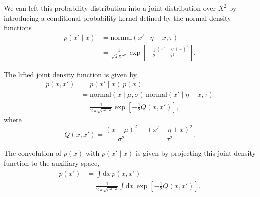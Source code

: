 \documentclass[11pt, oneside]{article}
\begin{document}
We can left this probability distribution into a joint distribution 
over $X^{2}$ by introducing a conditional probability kernel defined
by the normal density functions
%
%
\begin{align*}
p( x' \mid x )
&=
\text{normal} ( x' \mid \eta - x, \tau )
\\
&=
\frac{1}{ \sqrt{ 2 \, \pi \, \tau^{2} } }
\exp \left[
  -\frac{1}{2} \frac{ ( x' - \eta + x )^{2} }{ \tau^{2} }
\right].
\end{align*}

The lifted joint density function is given by
%
\begin{align*}
p( x, x' )
&=
p( x' \mid x ) \, p( x )
\\
&=
\text{normal} ( x \mid \mu, \sigma ) \,
\text{normal} ( x' \mid \eta - x, \tau )
\\
&=
\frac{1}{ 2 \, \pi \, \sqrt{ \sigma^{2} \, \tau^{2} } }
\exp \left[
  -\frac{1}{2} Q(x, x')
\right],
\end{align*}
%
where
%
\begin{equation*}
Q(x, x') 
= 
  \frac{ ( x - \mu )^{2} }{ \sigma^{2} }
+ \frac{ ( x' - \eta + x )^{2} }{ \tau^{2} }.
\end{equation*}

The convolution of $p(x)$ with $p(x' \mid x)$ is given by 
projecting this joint density function to the auxiliary 
space,
%
\begin{align*}
p( x' ) 
&= 
\int \mathrm{d} x \, p( x, x' )
\\
&=
\frac{1}{ 2 \, \pi \, \sqrt{ \sigma^{2} \, \tau^{2} } }
\int \mathrm{d} x \, 
\exp \left[
  -\frac{1}{2} Q(x, x')
\right].
\end{align*}
\end{document}
